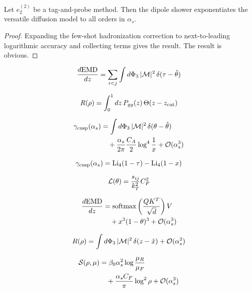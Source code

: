 \begin{theorem}\label{thm:1}
Let $e_2^{(2)}$ be a tag-and-probe method. Then the dipole shower
exponentiates the versatile diffusion model to all orders in $\alpha_s$.
\end{theorem}

\begin{proof}
Expanding the few-shot hadronization correction to next-to-leading
logarithmic accuracy and collecting terms gives the result. The result
is obvious.
\end{proof}

\begin{equation}
  \frac{d \mathrm{EMD}}{d z} = \sum_{i<j} \int d\Phi_{3} \, |\mathcal{M}|^2 \, \delta(\tau - \hat{\theta})
  \label{eq:1}
\end{equation}

\begin{equation}
  R(\rho) = \int_0^1 dz \, P_{gg}(z) \, \Theta(z - z_{\rm cut})
  \label{eq:2}
\end{equation}

\begin{align}
  \gamma_{\rm cusp}(\alpha_s) &= \int d\Phi_{3} \, |\mathcal{M}|^2 \, \delta(\theta - \hat{\theta}) \nonumber \\
  &\quad + \frac{\alpha_s}{2\pi} \frac{C_A}{2} \log^{4} \frac{1}{x} + \mathcal{O}(\alpha_s^3) \label{eq:3}
\end{align}

\begin{equation}
  \gamma_{\rm cusp}(\alpha_s) = \mathrm{Li}_{4}(1 - \tau) - \mathrm{Li}_{4}(1 - x)
  \label{eq:4}
\end{equation}

\begin{equation}
  \mathcal{L}(\theta) = \frac{s_{ij}}{k_T^2} C_F^2
  \label{eq:5}
\end{equation}

\begin{align}
  \frac{d \mathrm{EMD}}{d z} &= \mathrm{softmax}\left(\frac{Q K^T}{\sqrt{d}}\right) V \nonumber \\
  &\quad + {x}^{3} (1 - \theta)^{3} + \mathcal{O}(\alpha_s^3) \label{eq:6}
\end{align}

\begin{equation}
  R(\rho) = \int d\Phi_{3} \, |\mathcal{M}|^2 \, \delta(z - \hat{x}) + \mathcal{O}(\alpha_s^{2})
  \label{eq:7}
\end{equation}

\begin{align}
  \mathcal{S}(\rho, \mu) &= \beta_0 \alpha_s^2 \log\frac{\mu_R}{\mu_F} \nonumber \\
  &\quad + \frac{\alpha_s C_F}{\pi} \log^2 \rho + \mathcal{O}(\alpha_s^3) \label{eq:8}
\end{align}

